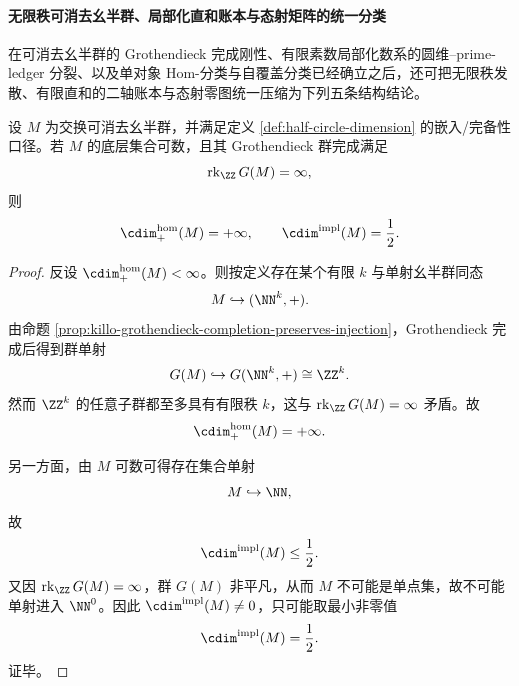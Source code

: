 \paragraph{无限秩可消去幺半群、局部化直和账本与态射矩阵的统一分类}
在可消去幺半群的 Grothendieck 完成刚性、有限素数局部化数系的圆维--prime-ledger 分裂、以及单对象 \(\mathrm{Hom}\)-分类与自覆盖分类已经确立之后，还可把无限秩发散、有限直和的二轴账本与态射零图统一压缩为下列五条结构结论。

\begin{theorem}\label{thm:xi-infinite-grothendieck-rank-halfdimension-divergence}
设 \(M\) 为交换可消去幺半群，并满足定义 \ref{def:half-circle-dimension} 的嵌入/完备性口径。若 \(M\) 的底层集合可数，且其 Grothendieck 群完成满足
\[
\operatorname{rk}_{\ZZ}G(M)=\infty,
\]
则
\[
\cdim^{\mathrm{hom}}_{+}(M)=+\infty,
\qquad
\cdim^{\mathrm{impl}}(M)=\frac12.
\]
\end{theorem}
\begin{proof}
反设 \(\cdim^{\mathrm{hom}}_{+}(M)<\infty\)。则按定义存在某个有限 \(k\) 与单射幺半群同态
\[
M\hookrightarrow (\NN^k,+).
\]
由命题 \ref{prop:killo-grothendieck-completion-preserves-injection}，Grothendieck 完成后得到群单射
\[
G(M)\hookrightarrow G(\NN^k,+)\cong \ZZ^k.
\]
然而 \(\ZZ^k\) 的任意子群都至多具有有限秩 \(k\)，这与 \(\operatorname{rk}_{\ZZ}G(M)=\infty\) 矛盾。故
\[
\cdim^{\mathrm{hom}}_{+}(M)=+\infty.
\]

另一方面，由 \(M\) 可数可得存在集合单射
\[
M\hookrightarrow \NN,
\]
故
\[
\cdim^{\mathrm{impl}}(M)\le \frac12.
\]
又因 \(\operatorname{rk}_{\ZZ}G(M)=\infty\)，群 \(G(M)\) 非平凡，从而 \(M\) 不可能是单点集，故不可能单射进入 \(\NN^0\)。因此 \(\cdim^{\mathrm{impl}}(M)\neq 0\)，只可能取最小非零值
\[
\cdim^{\mathrm{impl}}(M)=\frac12.
\]
证毕。
\end{proof}

